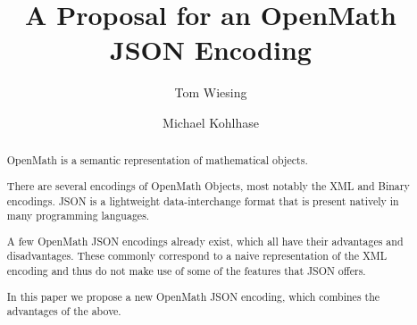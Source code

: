 \documentclass[12pt]{article}
\title{A Proposal for an OpenMath JSON Encoding}
\author{Tom Wiesing\and Michael Kohlhase}
\begin{document}
\maketitle

\begin{abstract}
  OpenMath is a semantic representation of mathematical objects. 
  
  There are several encodings of OpenMath Objects, most notably the XML and Binary encodings. 
  JSON is a lightweight data-interchange format that is present natively in many programming languages. 
  
  A few OpenMath JSON encodings already exist, which all have their advantages and
  disadvantages.  These commonly correspond to a naive representation of the XML encoding
  and thus do not make use of some of the features that JSON offers.
        
  In this paper we propose a new OpenMath JSON encoding, which combines the advantages of
  the above.
\end{abstract}
    
    
\newpage
\tableofcontents
\newpage




\printbibliography
\end{document}
